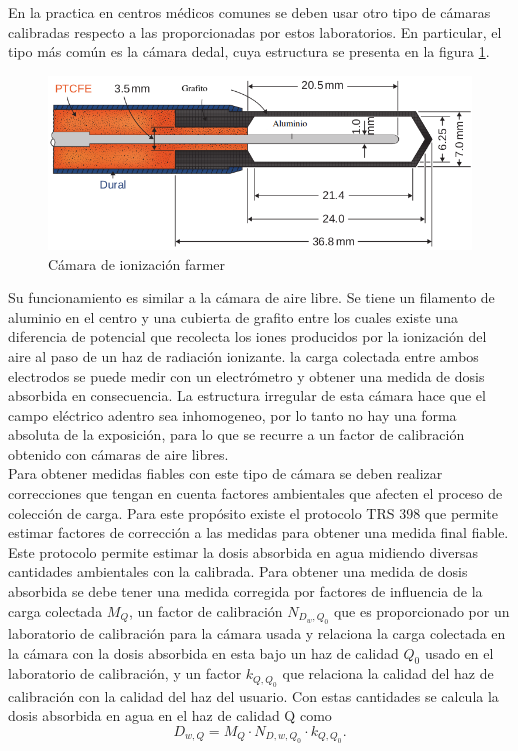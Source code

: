 En la practica en centros médicos comunes se deben usar otro tipo de cámaras calibradas respecto a las proporcionadas por estos laboratorios. En particular, el tipo más común es la cámara dedal, cuya estructura se presenta en la figura \ref{fig:farmer}.\\

\begin{figure}[H]
	\centering
	\includegraphics[width=0.7\linewidth]{images/camaraIoni.png}
	\caption{Cámara de ionización farmer\cite{khan2014the}}
	\label{fig:farmer}
\end{figure}

Su funcionamiento es similar a la cámara de aire libre. Se tiene un filamento de aluminio en el centro y una cubierta de grafito entre los cuales existe una diferencia de potencial que recolecta los iones producidos por la ionización del aire al paso de un haz de radiación ionizante. la carga colectada entre ambos electrodos se puede medir con un electrómetro y obtener una medida de dosis absorbida en consecuencia. La estructura irregular de esta  cámara hace que el campo eléctrico adentro sea inhomogeneo, por lo tanto no hay una forma absoluta de la exposición, para lo que se recurre a un factor de calibración obtenido con cámaras de aire libres.\\

Para obtener medidas fiables con este tipo de cámara se deben realizar correcciones que tengan en cuenta factores ambientales que afecten el proceso de colección de carga. Para este propósito existe el protocolo TRS 398 que permite estimar factores de corrección a las medidas para obtener una medida final fiable.\\

Este protocolo permite estimar la dosis absorbida en agua midiendo diversas cantidades ambientales con la calibrada. Para obtener una medida de dosis absorbida se debe tener una medida corregida por factores de influencia de la carga colectada $M_{Q}$, un factor de calibración $N_{D_{w},Q_{0}}$ que es proporcionado por un laboratorio de calibración para la cámara usada y relaciona la carga colectada en la cámara con la dosis absorbida en esta bajo un haz de calidad $Q_0$ usado en el laboratorio de calibración, y un factor $k_{Q,Q_{0}}$ que relaciona la calidad del haz de calibración con la calidad del haz del usuario. Con estas cantidades se calcula la dosis absorbida en agua en el haz de calidad Q como
\begin{equation}
D_{w,Q}=M_{Q}\cdot N_{D,w,Q_{0}}\cdot k_{Q,Q_{0}}.
\end{equation}

